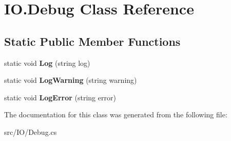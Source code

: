 \hypertarget{class_i_o_1_1_debug}{}\section{I\+O.\+Debug Class Reference}
\label{class_i_o_1_1_debug}
\subsection*{Static Public Member Functions}
\begin{DoxyCompactItemize}
\item 
\mbox{\label{class_i_o_1_1_debug_af4e5c954d9c5df29b4936fdfb388bb57}} 
static void {\bfseries Log} (string log)
\item 
\mbox{\label{class_i_o_1_1_debug_a64e7869062d1bb94006b1174673ac36b}} 
static void {\bfseries Log\+Warning} (string warning)
\item 
\mbox{\label{class_i_o_1_1_debug_a0c08a7c31a3d9b91cef8e87a832326a2}} 
static void {\bfseries Log\+Error} (string error)
\end{DoxyCompactItemize}


The documentation for this class was generated from the following file\+:\begin{DoxyCompactItemize}
\item 
src/\+I\+O/Debug.\+cs\end{DoxyCompactItemize}
